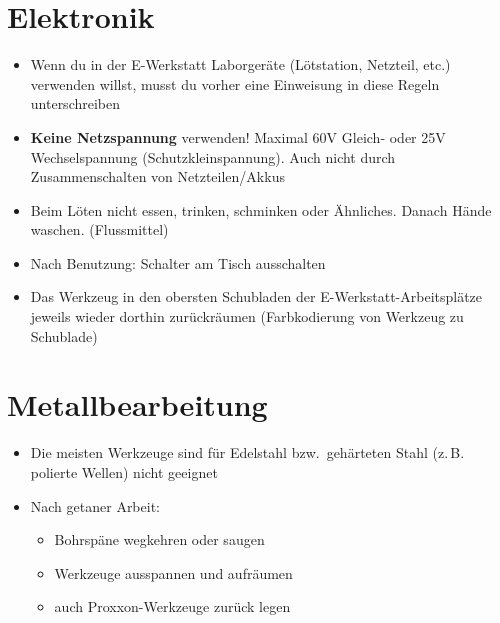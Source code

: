 \documentclass[13pt]{\basedir/fablab-document}
\begin{document}
\vbox{\vspace{0,5cm}}

\section{Elektronik}
\begin{itemize}
  \item Wenn du in der E-Werkstatt Laborgeräte (Lötstation, Netzteil, etc.) verwenden willst, musst du vorher eine Einweisung in diese Regeln unterschreiben
  \item \textbf{Keine Netzspannung} verwenden! Maximal 60V Gleich- oder 25V Wechselspannung (Schutzkleinspannung). Auch nicht durch Zusammenschalten von Netzteilen/Akkus

 \item Beim Löten nicht essen, trinken, schminken oder Ähnliches. Danach Hände waschen. (Flussmittel)
 \item Nach Benutzung: Schalter am Tisch ausschalten
 \item Das Werkzeug in den obersten Schubladen der E-Werkstatt-Arbeitsplätze jeweils wieder dorthin zurückräumen (Farbkodierung von Werkzeug zu Schublade)
\end{itemize}


\section{Metallbearbeitung}
\begin{itemize}
	\item Die meisten Werkzeuge sind für Edelstahl bzw.\  gehärteten Stahl (z.\,B. polierte Wellen) nicht geeignet
	\item Nach getaner Arbeit:
	\begin{itemize}
		\item Bohrspäne wegkehren oder saugen
		\item Werkzeuge ausspannen und aufräumen
		\item auch Proxxon-Werkzeuge zurück legen
	\end{itemize}
\end{itemize}
\end{document}
